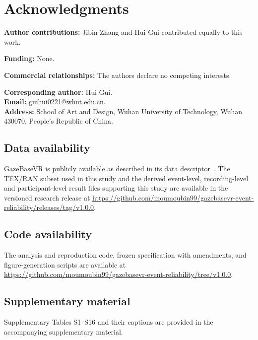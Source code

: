 \section*{Acknowledgments}
\noindent\textbf{Author contributions:} Jibin Zhang and Hui Gui contributed equally to this work.

\noindent\textbf{Funding:} None.

\noindent\textbf{Commercial relationships:} The authors declare no competing interests.

\noindent\textbf{Corresponding author:} Hui Gui.\\
\textbf{Email:} \href{mailto:guihui0221@whut.edu.cn}{guihui0221@whut.edu.cn}.\\
\textbf{Address:} School of Art and Design, Wuhan University of Technology, Wuhan 430070, People's Republic of China.

\subsection*{Data availability}
GazeBaseVR is publicly available as described in its data descriptor~\citep{lohr2023}. The TEX/RAN subset used in this study and the derived event-level, recording-level and participant-level result files supporting this study are available in the versioned research release at \url{https://github.com/moumoubin99/gazebasevr-event-reliability/releases/tag/v1.0.0}.

\subsection*{Code availability}
The analysis and reproduction code, frozen specification with amendments, and figure-generation scripts are available at \url{https://github.com/moumoubin99/gazebasevr-event-reliability/tree/v1.0.0}.

\subsection*{Supplementary material}
Supplementary Tables S1--S16 and their captions are provided in the accompanying supplementary material.
